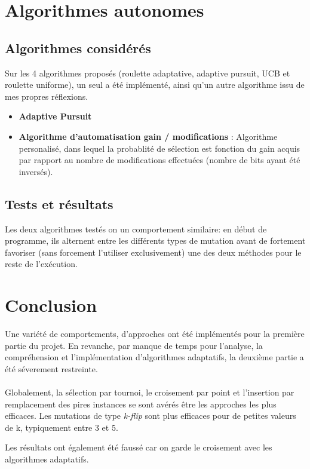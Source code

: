 \documentclass[a4paper,10pt]{report}
\begin{document}
\chapter{Algorithmes autonomes}
\section{Algorithmes considérés}
Sur les 4 algorithmes proposés (roulette adaptative, adaptive pursuit, UCB et roulette uniforme), un seul a été implémenté,
ainsi qu'un autre algorithme issu de mes propres réflexions.

\begin{itemize}
  \item \textbf{Adaptive Pursuit}
  \item \textbf{Algorithme d'automatisation gain / modifications} : Algorithme personalisé, dans lequel la probablité de sélection
	est fonction du gain acquis par rapport au nombre de modifications effectuées (nombre de bits ayant été inversés).
\end{itemize}


\section{Tests et résultats}

Les deux algorithmes testés on un comportement similaire: en début de programme, ils alternent entre les différents types de mutation
avant de fortement favoriser (sans forcement l'utiliser exclusivement) une des deux méthodes pour le reste de l'exécution.


\chapter{Conclusion}

Une variété de comportements, d'approches ont été implémentés pour la première partie du projet. En revanche, par manque de temps
pour l'analyse, la compréhension et l'implémentation d'algorithmes adaptatifs, la deuxième partie a été séverement restreinte. \\ \\

Globalement, la sélection par tournoi, le croisement par point et l'insertion par remplacement des pires instances se sont avérés
être les approches les plus efficaces. Les mutations de type \textit{k-flip} sont plus efficaces pour de petites valeurs de k,
typiquement entre 3 et 5.

Les résultats ont également été faussé car on garde le croisement avec les algorithmes adaptatifs.
\end{document}
